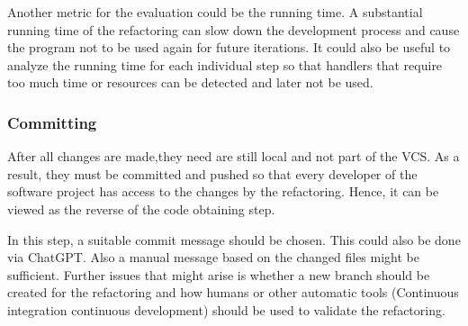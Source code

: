 Another metric for the evaluation could be the running time. A substantial running time of the refactoring can slow down the development process and cause the program not to be used again for future iterations. It could also be useful to analyze the running time for each individual step so that handlers that require too much time or resources can be detected and later not be used. 

\subsubsection{Committing}

After all changes are made,they need are still local and not part of the \ac{VCS}. As a result, they must be committed and pushed so that every developer of the software project has access to the changes by the refactoring. Hence, it can be viewed as the reverse of the code obtaining step. 

In this step, a suitable commit message should be chosen. This could also be done via ChatGPT. Also a manual message based on the changed files might be sufficient. Further issues that might arise is whether a new branch should be created for the refactoring and how humans or other automatic tools (Continuous integration continuous development) should be used to validate the refactoring.  